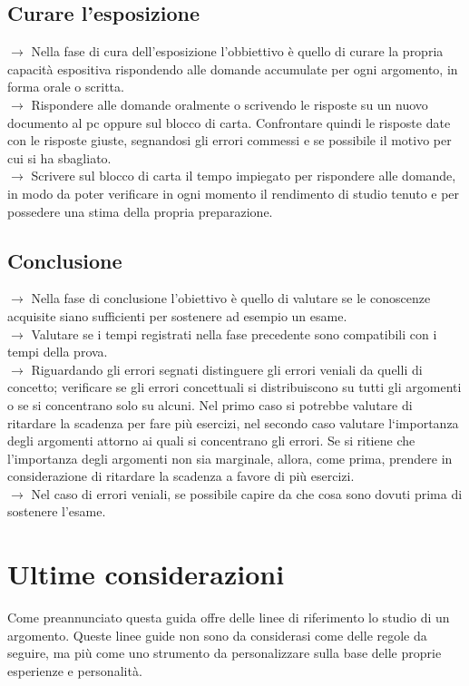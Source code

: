 \documentclass[11pt,a4paper]{article}
\begin{document}
\subsection{Curare l'esposizione}
$\rightarrow$ Nella fase di cura dell'esposizione l'obbiettivo è quello di curare la propria capacità espositiva rispondendo alle domande accumulate per ogni argomento, in forma orale o scritta.\\
$\rightarrow$ Rispondere alle domande oralmente o scrivendo le risposte su un nuovo documento al pc oppure sul blocco di carta. Confrontare quindi le risposte date con le risposte giuste, segnandosi gli errori commessi e se possibile il motivo per cui si ha sbagliato.\\
$\rightarrow$ Scrivere sul blocco di carta il tempo impiegato per rispondere alle domande, in modo da poter verificare in ogni momento il rendimento di studio tenuto e per possedere una stima della propria preparazione.\\

\subsection{Conclusione}
$\rightarrow$ Nella fase di conclusione l'obiettivo è quello di valutare se le conoscenze acquisite siano sufficienti per sostenere ad esempio un esame. \\
$\rightarrow$ Valutare se i tempi registrati nella fase precedente sono compatibili con i tempi della prova.\\
$\rightarrow$ Riguardando gli errori segnati distinguere gli errori veniali da quelli di concetto; verificare se gli errori concettuali si distribuiscono su tutti gli argomenti o se si concentrano solo su alcuni.  Nel primo caso si potrebbe valutare di ritardare la scadenza per fare più esercizi, nel secondo caso valutare l`importanza degli argomenti attorno ai quali si concentrano gli errori. Se si ritiene che l'importanza degli argomenti non sia marginale, allora, come prima, prendere in considerazione di ritardare la scadenza a favore di più esercizi.\\
$\rightarrow$ Nel caso di errori veniali, se possibile capire da che cosa sono dovuti prima di sostenere l'esame.\\

\section{Ultime considerazioni}
Come preannunciato questa guida offre delle linee di riferimento lo studio di un argomento. Queste linee guide non sono da considerasi come delle regole da seguire, ma più come uno strumento da personalizzare sulla base delle proprie esperienze e personalità. \\
	
\end{document}

